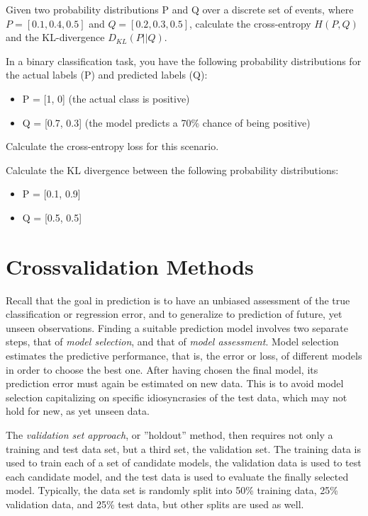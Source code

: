 \begin{exerciseboxpaper}
Given two probability distributions P and Q over a discrete set of events, where $P = [0.1, 0.4, 0.5]$ and $Q = [0.2, 0.3, 0.5]$, calculate the cross-entropy $H(P, Q)$ and the KL-divergence $D_{KL}(P || Q)$.
\end{exerciseboxpaper}

\begin{exerciseboxpaper}
In a binary classification task, you have the following probability distributions for the actual labels (P) and predicted labels (Q):
\begin{itemize}
  \item P = [1, 0] (the actual class is positive)
  \item Q = [0.7, 0.3] (the model predicts a 70\% chance of being positive)
\end{itemize}
Calculate the cross-entropy loss for this scenario.
\end{exerciseboxpaper}

\begin{exerciseboxpaper}
Calculate the KL divergence between the following probability distributions:
  \begin{itemize}
     \item P = [0.1, 0.9]
     \item Q = [0.5, 0.5]
  \end{itemize}
\end{exerciseboxpaper}

\section{Crossvalidation Methods}
\label{sec:crossvalidation}

Recall that the goal in prediction is to have an unbiased assessment of the true classification or regression error, and to generalize to prediction of future, yet unseen observations. Finding a suitable prediction model involves two separate steps, that of \emph{model selection}, and that of \emph{model assessment}. Model selection estimates the predictive performance, that is, the error or loss, of different models in order to choose the best one. After having chosen the final model, its prediction error must again be estimated on new data. This is to avoid model selection capitalizing on specific idiosyncrasies of the test data, which may not hold for new, as yet unseen data.

The \emph{validation set approach}, or ''holdout'' method, then requires not only a training and test data set, but a third set, the validation set. The training data is used to train each of a set of candidate models, the validation data is used to test each candidate model, and the test data is used to evaluate the finally selected model. Typically, the data set is randomly split into 50\% training data, 25\% validation data, and 25\% test data, but other splits are used as well. 

